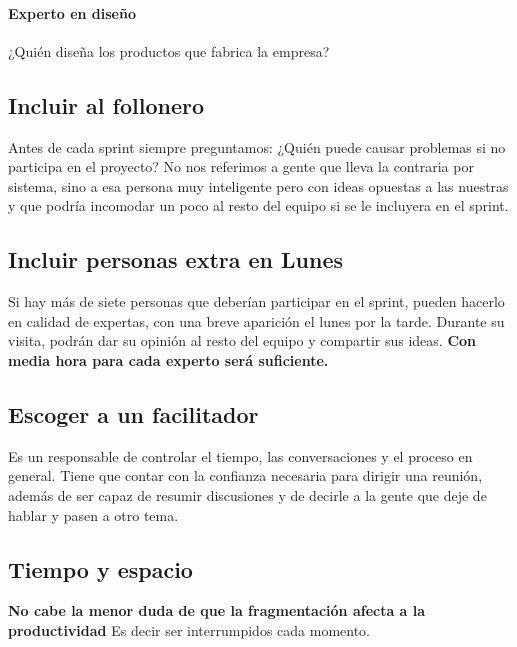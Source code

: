 \documentclass[10pt]{article}
\begin{document}
\begin{multicols}{2}
\paragraph*{Experto en diseño}
¿Quién diseña los productos que fabrica la empresa?

\subsection*{Incluir al follonero}
Antes de cada sprint siempre preguntamos: ¿Quién puede causar problemas si no participa en el proyecto? No nos referimos a gente que lleva la contraria por sistema, sino a esa persona muy inteligente pero con ideas opuestas a las nuestras y que podría incomodar un poco al resto del equipo si se le incluyera en el sprint.
\subsection*{Incluir personas extra en Lunes}
Si hay más de siete personas que deberían participar en el sprint, pueden hacerlo en calidad de expertas, con una breve aparición el lunes por la tarde. Durante su visita, podrán dar su opinión al resto del equipo y compartir sus ideas. \textbf{Con media hora para cada experto será suficiente.}
\subsection*{Escoger a un facilitador}
Es un responsable de controlar el tiempo, las conversaciones y el proceso en general. Tiene que contar con la confianza necesaria para dirigir una reunión, además de ser capaz de resumir discusiones y de decirle a la gente que deje de hablar y pasen a otro tema.
\subsection*{Tiempo y espacio}
\textbf{No cabe la menor duda de que la fragmentación afecta a la productividad} Es decir ser interrumpidos cada momento.\\
\end{multicols}
\end{document}
